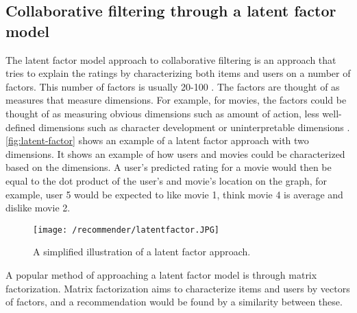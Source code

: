 \subsection{Collaborative filtering through a latent factor model}
The latent factor model approach to collaborative filtering is an approach that tries to explain the ratings by characterizing both items and users on a number of factors.
This number of factors is usually 20-100 \cite{MatrixFactorization}. 
The factors are thought of as measures that measure dimensions.
For example, for movies, the factors could be thought of as measuring obvious dimensions such as amount of action, less well-defined dimensions such as character development or uninterpretable dimensions \cite{MatrixFactorization}.
\autoref{fig:latent-factor} shows an example of a latent factor approach with two dimensions.
It shows an example of how users and movies could be characterized based on the dimensions.
A user's predicted rating for a movie would then be equal to the dot product of the user's and movie's location on the graph, for example, user 5 would be expected to like movie 1, think movie 4 is average and dislike movie 2.
\begin{figure}[H]
    \texttt{[image: /recommender/latentfactor.JPG]}
     \caption{A simplified illustration of a latent factor approach.}
     \label{fig:latent-factor}
 \end{figure}
 \noindent
A popular method of approaching a latent factor model is through matrix factorization.
Matrix factorization aims to characterize items and users by vectors of factors, and a recommendation would be found by a similarity between these.

